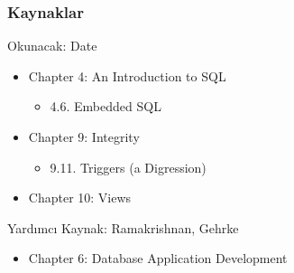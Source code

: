 \documentclass[dvipsnames]{beamer}
\theoremstyle{definition}
\theoremstyle{example}
\theoremstyle{plain}
\begin{document}
\begin{frame}
  \frametitle{Kaynaklar}

  \begin{block}{Okunacak: Date}
    \begin{itemize}
      \item Chapter 4: An Introduction to SQL
      \begin{itemize}
        \item 4.6. Embedded SQL
      \end{itemize}

      \item Chapter 9: Integrity
      \begin{itemize}
        \item 9.11. \alert{Triggers (a Digression)}
      \end{itemize}

      \item Chapter 10: \alert{Views}
    \end{itemize}
  \end{block}

  \begin{block}{Yardımcı Kaynak: Ramakrishnan, Gehrke}
    \begin{itemize}
      \item Chapter 6: Database Application Development
    \end{itemize}
  \end{block}
\end{frame}
\end{document}
